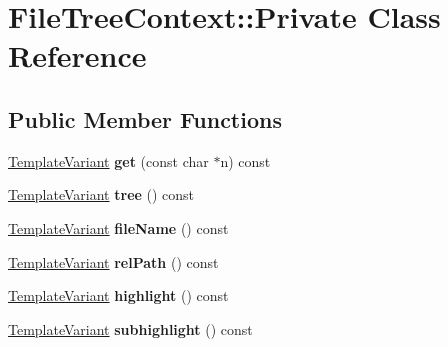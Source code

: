\hypertarget{class_file_tree_context_1_1_private}{}\section{File\+Tree\+Context\+::Private Class Reference}
\label{class_file_tree_context_1_1_private}
\subsection*{Public Member Functions}
\begin{DoxyCompactItemize}
\item 
\mbox{\label{class_file_tree_context_1_1_private_a9cd80b3bce6abc354b9e6ec59f2a936b}} 
\mbox{\hyperlink{class_template_variant}{Template\+Variant}} {\bfseries get} (const char $\ast$n) const
\item 
\mbox{\label{class_file_tree_context_1_1_private_a3816e208bd9e906ebad87251e63af51d}} 
\mbox{\hyperlink{class_template_variant}{Template\+Variant}} {\bfseries tree} () const
\item 
\mbox{\label{class_file_tree_context_1_1_private_ae3af7f0710d967aafd8b6cbf1a2a7039}} 
\mbox{\hyperlink{class_template_variant}{Template\+Variant}} {\bfseries file\+Name} () const
\item 
\mbox{\label{class_file_tree_context_1_1_private_a44b9e5488692c9b441c27e75de0c3a8d}} 
\mbox{\hyperlink{class_template_variant}{Template\+Variant}} {\bfseries rel\+Path} () const
\item 
\mbox{\label{class_file_tree_context_1_1_private_a088c13f31974a648949aaba0fc76cfa1}} 
\mbox{\hyperlink{class_template_variant}{Template\+Variant}} {\bfseries highlight} () const
\item 
\mbox{\label{class_file_tree_context_1_1_private_ac8b5160a5f81eaf3726d664ca00240ef}} 
\mbox{\hyperlink{class_template_variant}{Template\+Variant}} {\bfseries subhighlight} () const
\item 
\mbox{\label{class_file_tree_context_1_1_private_a9970b6ea4e51d62f2c9d8cd923d6121d}} 

\end{DoxyCompactItemize}
